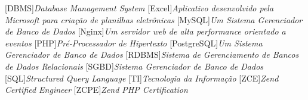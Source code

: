 
[DBMS]{\textit{Database Management System}}
[Excel]{\textit{Aplicativo desenvolvido pela Microsoft para
criação de planilhas eletrônicas}}
[MySQL]{\textit{Um Sistema Gerenciador de Banco de Dados}}
[Nginx]{\textit{Um servidor web de alta performance orientado a
eventos}}
[PHP]{\textit{Pré-Processador de Hipertexto}}
[PostgreSQL]{\textit{Um Sistema Gerenciador de Banco de Dados}}
[RDBMS]{\textit{Sistema de Gerenciamento de Bancos de Dados
Relacionais}}
[SGBD]{\textit{Sistema Gerenciador de Banco de Dados}}
[SQL]{\textit{Structured Query Language}}
[TI]{\textit{Tecnologia da Informação}}
[ZCE]{\textit{Zend Certified Engineer}}
[ZCPE]{\textit{Zend PHP Certification}}